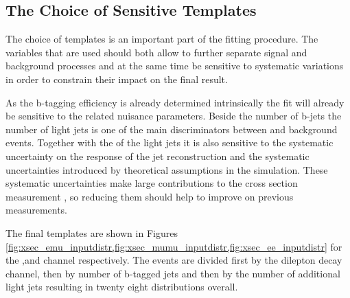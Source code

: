\subsection{The Choice of Sensitive Templates}
\label{sec:xsec_templates}

The choice of templates is an important part of the fitting procedure.
The variables that are used should both allow to further separate signal and background processes and at the same time be sensitive to systematic
variations in order to constrain their impact on the final result.

As the b-tagging efficiency is already determined intrinsically the fit will already be sensitive to the related nuisance parameters.
Beside the number of b-jets the number of light jets is one of the main discriminators between \ttbar and background events.
Together with the \pt of the light jets it is also sensitive to the systematic uncertainty on the response of the jet reconstruction and
the systematic uncertainties introduced by theoretical assumptions in the simulation.
These systematic uncertainties make large contributions to the \ttbar cross section measurement , so reducing
them should help to improve on previous measurements.

The final templates are shown in Figures \ref{fig:xsec_emu_inputdistr,fig:xsec_mumu_inputdistr,fig:xsec_ee_inputdistr} for the \emu,\mumu and \ee channel respectively. The events are divided first by the dilepton decay channel, then by number of b-tagged jets and 
then by the number of additional light jets resulting in twenty eight distributions overall.

